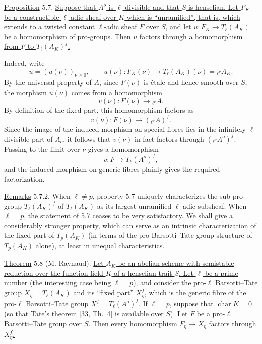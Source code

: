 \par\medskip
\noindent
\underline{Proposition} 5.7. \underline{Suppose that $A^o$ is
$\ell$-divisible and that $S$ is henselian. Let $F_K$ be a
constructible $\ell$-adic sheaf over $K$ which is ``unramified'', that
is, which extends to a twisted constant $\ell$-adic sheaf $F$ over
$S$, and let $u:F_K\longrightarrow T_\ell(A_K)$ be a homomorphism of
pro-groups. Then $u$ factors through a homomorphism from $F$ to
$T_\ell(A_K)^f$.}

Indeed, write
\begin{equation}\tag{5.7.1}
 u=(u(\nu))_{\nu\geqslant0},\qquad
 u(\nu):F_K(\nu)\longrightarrow T_\ell(A_K)(\nu)
 ={}_{\ell^\nu}A_K.
\end{equation}
By the universal property of $A$, since $F(\nu)$ is \'{e}tale and
hence smooth over $S$, the morphism $u(\nu)$ comes from a
homomorphism
\[
 v(\nu):F(\nu)\longrightarrow{}_{\ell^\nu}A.
\]
By definition of the fixed part, this homomorphism factors as
\[
 v(\nu):F(\nu)\longrightarrow({}_{\ell^\nu}A)^f.
\]
Since the image of the induced morphism on special fibres lies in the
infinitely $\ell$-divisible part of $A_o$, it follows that $v(\nu)$
in fact factors through $({}_{\ell^\nu}A^o)^f$. Passing to the limit
over $\nu$ gives a homomorphism
\[
 v:F\longrightarrow T_\ell(A^o)^f,
\]
and the induced morphism on generic fibres plainly gives the required
factorization.

\medskip
\noindent
\underline{Remarks} 5.7.2. When $\ell\neq p$, property 5.7 uniquely
characterizes the sub-pro-group $T_\ell(A_K)^f$ of $T_\ell(A_K)$ as
its largest unramified $\ell$-adic subsheaf. When $\ell=p$, the
statement of 5.7 ceases to be very satisfactory. We shall give a
considerably stronger property, which can serve as an intrinsic
characterization of the fixed part of $T_p(A_K)$ (in terms of the
pro-Barsotti--Tate group structure of $T_p(A_K)$ alone), at least in
unequal characteristics.

\medskip
\noindent
\underline{Theorem} 5.8 (M. Raynaud). \underline{Let $A_K$ be an
abelian scheme with semistable reduction over the function field $K$
of a henselian trait $S$. Let $\ell$ be a prime number (the
interesting case being $\ell=p$), and consider the pro-$\ell$
Barsotti--Tate group $X_\eta=T_\ell(A_K)$ and its ``fixed part''
$X_\eta^f$, which is the generic fibre of the pro-$\ell$
Barsotti--Tate group $X^f=T_\ell(A^o)^f$. If $\ell=p$, suppose that
$\operatorname{char}K=0$ (so that Tate's theorem [33, Th.\ 4] is
available over $S$). Let $F$ be a pro-$\ell$ Barsotti--Tate group over
$S$. Then every homomorphism $F_\eta\longrightarrow X_\eta$ factors
through $X_\eta^f$.}

